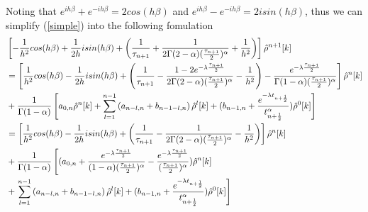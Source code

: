 \documentclass[10pt, reqno]{amsart}
\theoremstyle{remark}
\theoremstyle{definition}
\numberwithin{table}{section}
\begin{document}
Noting that $e^{ih\beta}+e^{-ih\beta}=2cos(h\beta)$ and $e^{ih\beta}-e^{-ih\beta}=2isin(h\beta)$, thus we can simplify (\ref{simple}) into the following fomulation
\begin{align}
    &\left[-\frac{1}{h^2}cos(h\beta)+\frac{1}{2h}isin(h\beta)+\left(\frac{1}{\tau_{n+1}}+\frac{1}{2\Gamma(2-\alpha)(\frac{\tau_{n+1}}{2})^\alpha}+\frac{1}{h^2}\right) \right]\hat{\rho}^{n+1}[k]\notag \\
    &=\left[\frac{1}{h^2}cos(h\beta)-\frac{1}{2h}isin(h\beta)+\left(\frac{1}{\tau_{n+1}}-\frac{1-2e^{-\lambda \frac{\tau_{n+1}}{2}}}{2\Gamma(2-\alpha)(\frac{\tau_{n+1}}{2})^\alpha}-\frac{1}{h^2}\right) -\frac{e^{-\lambda \frac{\tau_{n+1}}{2}}}{\Gamma(1-\alpha)(\frac{\tau_{n+1}}{2})^\alpha}\right]\hat{\rho}^{n}[k] \notag\\
    &+\frac{1}{\Gamma(1-\alpha)}\left[a_{0, n} \hat{\rho}^{n}[k]+\sum\limits_{l=1}^{n-1} \left(a_{n-l, n}+b_{n-1-l, n}\right) \hat{\rho}^{l}[k]+(b_{n-1, n}+\frac{e^{-\lambda t_{n+\frac{1}{2}}}}{t_{n+\frac{1}{2}}^\alpha}) \hat{\rho}^{0}[k]\right]\notag\\
    &=\left[\frac{1}{h^2}cos(h\beta)-\frac{1}{2h}isin(h\beta)+\left(\frac{1}{\tau_{n+1}}-\frac{1}{2\Gamma(2-\alpha)(\frac{\tau_{n+1}}{2})^\alpha}-\frac{1}{h^2}\right) \right]\hat{\rho}^{n}[k] \notag\\
    &+\frac{1}{\Gamma(1-\alpha)}\left[(a_{0, n} +\frac{e^{-\lambda \frac{\tau_{n+1}}{2}}}{(1-\alpha)(\frac{\tau_{n+1}}{2})^\alpha}-\frac{e^{-\lambda \frac{\tau_{n+1}}{2}}}{(\frac{\tau_{n+1}}{2})^\alpha})\hat{\rho}^{n}[k]\right.\notag\\
    &+\left.\sum\limits_{l=1}^{n-1} \left(a_{n-l, n}+b_{n-1-l, n}\right) \hat{\rho}^{l}[k]+(b_{n-1, n}+\frac{e^{-\lambda t_{n+\frac{1}{2}}}}{t_{n+\frac{1}{2}}^\alpha}) \hat{\rho}^{0}[k]\right]\label{d0}
\end{align}
\end{document}
